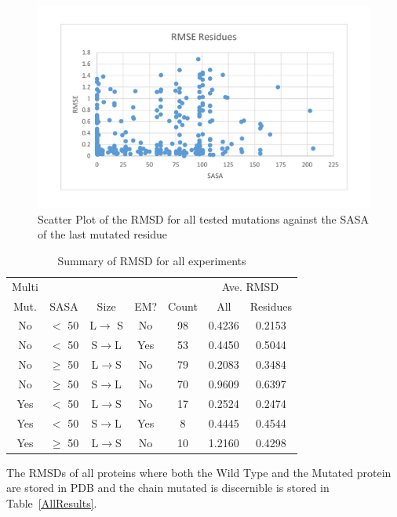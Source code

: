 \documentclass[sigconf]{acmart}
\begin{document}
\begin{figure}[h]
	\includegraphics[width=1.1\linewidth]{Figures/Results.pdf}
	\caption{Scatter Plot of the RMSD for all tested mutations against the SASA of the last mutated residue}
	\label{result}
\end{figure}
\begin{table}[h]
	\caption{Summary of RMSD for all experiments }
	\label{summary}
	\centering
	\begin{tabular}{|c|c|c|c|c|c|c|} \hline
		\rowcolor{lightgray}Multi &  &  &  &  & \multicolumn{2}{c|}{Ave. RMSD} \\
		\rowcolor{lightgray}Mut. & SASA & Size & EM? & Count & All & Residues \\ \hline
		No & $<$ 50 & L$\rightarrow$ S & No & 98 & 0.4236 & 0.2153 \\ \hline
		No & $<$ 50 & S$\rightarrow$L & Yes & 53 & 0.4450 & 0.5044 \\ \hline
		No & $\ge$ 50 & L$\rightarrow$S & No & 79 & 0.2083 & 0.3484 \\ \hline
		No & $\ge$ 50 & S$\rightarrow$L & No & 70 & 0.9609 & 0.6397 \\ \hline
		Yes & $<$ 50 & L$\rightarrow$S & No & 17 & 0.2524 & 0.2474 \\ \hline
		Yes & $<$ 50 & S$\rightarrow$L & Yes & 8 & 0.4445 & 0.4544 \\ \hline
		Yes & $\ge$ 50 & L$\rightarrow$S & No & 10 & 1.2160 & 0.4298 \\ \hline
	\end{tabular}
\end{table}

The RMSDs of all proteins where both the Wild Type and the Mutated protein are stored in PDB and the chain mutated is discernible is stored in Table~\ref{AllResults}.
\end{document}
